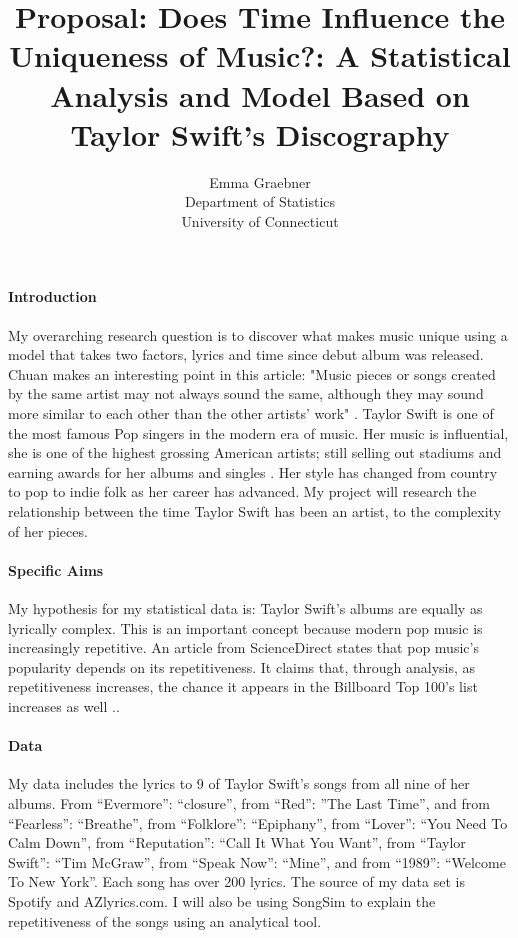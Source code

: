 \documentclass[12pt]{article}
\title{Proposal: Does Time Influence the Uniqueness of Music?: A Statistical Analysis and Model Based on Taylor Swift's Discography}
\author{Emma Graebner\\
  Department of Statistics\\
  University of Connecticut
}
\begin{document}
\maketitle


\paragraph{Introduction}
My overarching research question is to discover what makes music unique using a model that takes two factors, lyrics and time since debut album was released. Chuan makes an interesting point in this article: "Music pieces or songs created by the same artist may not always sound the same, although they may sound more similar to each other than the other artists' work" \cite{chuan2013multimodal}. Taylor Swift is one of the most famous Pop singers in the modern era of music. Her music is influential, she is one of the highest grossing American artists; still selling out stadiums and earning awards for her albums and singles \citep{fogarty2021you} . Her style has changed from country to pop to indie folk as her career has advanced. My project will research the relationship between the time Taylor Swift has been an artist, to the complexity of her pieces. \citep{sloan2021taylor} 


\citep{perone2017words}

\paragraph{Specific Aims}
My hypothesis for my statistical data is: Taylor Swift’s albums are equally as lyrically complex. This is an important concept because modern pop music is increasingly repetitive. An article from ScienceDirect states that pop music's popularity depends on its repetitiveness. It claims that, through analysis, as repetitiveness increases, the chance it appears in the Billboard Top 100's list increases as well \citep{nunes2015power}.. 



\paragraph{Data}
My data includes the lyrics to 9 of Taylor Swift’s songs from all nine of her albums. From “Evermore”: “closure”, from “Red”: ”The Last Time”, and from “Fearless”: “Breathe”, from “Folklore”: “Epiphany”, from “Lover”: “You Need To Calm Down”, from “Reputation”: “Call It What You Want”, from “Taylor Swift”: “Tim McGraw”, from “Speak Now”: “Mine”, and from “1989”: “Welcome To New York”. Each song has over 200 lyrics. The source of my data set is Spotify and AZlyrics.com. I will also be using SongSim to explain the repetitiveness of the songs using an analytical tool.
\end{document}
